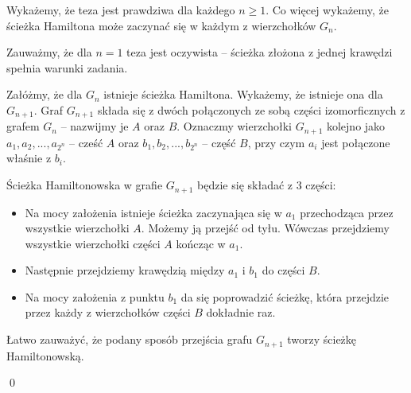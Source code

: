 \noindent
Wykażemy, że teza jest prawdziwa dla każdego $n \geqslant 1$. Co więcej wykażemy, że ścieżka Hamiltona może zaczynać się w każdym z wierzchołków $G_n$.

Zauważmy, że dla $n = 1$ teza jest oczywista -- ścieżka złożona z jednej krawędzi spełnia warunki zadania.

\vspace{10px}

\noindent
Załóżmy, że dla $G_n$ istnieje ścieżka Hamiltona. Wykażemy, że istnieje ona dla $G_{n + 1}$. Graf $G_{n+1}$ składa się z dwóch połączonych ze sobą części izomorficznych z grafem $G_n$ -- nazwijmy je $A$ oraz $B$. Oznaczmy wierzchołki $G_{n + 1}$ kolejno jako
$a_1, a_2, ..., a_{2^n}$ -- cześć $A$ oraz $b_1, b_2, ..., b_{2^n}$ -- część $B$, przy czym $a_i$ jest połączone właśnie z $b_i$. 

\vspace{10px}

\noindent
Ścieżka Hamiltonowska w grafie $G_{n + 1}$ będzie się składać z 3 części:
\begin{itemize}
	\item Na mocy założenia istnieje ścieżka zaczynająca się w $a_1$ przechodząca przez wszystkie wierzchołki $A$. Możemy ją przejść od tyłu. Wówczas przejdziemy wszystkie wierzchołki części $A$ kończąc w $a_1$.
	\item Następnie przejdziemy krawędzią między $a_1$ i $b_1$ do części $B$.
	\item Na mocy założenia z punktu $b_1$ da się poprowadzić ścieżkę, która przejdzie przez każdy z wierzchołków części $B$ dokładnie raz.
\end{itemize}

\noindent
Łatwo zauważyć, że podany sposób przejścia grafu $G_{n + 1}$ tworzy ścieżkę Hamiltonowską.

\qed

\newpage
